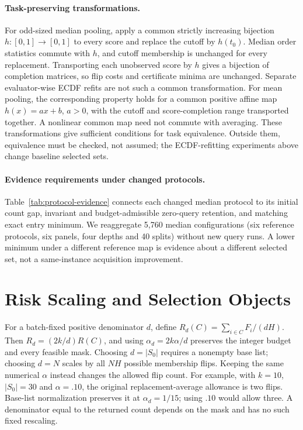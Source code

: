 \paragraph{Task-preserving transformations.}
For odd-sized median pooling, apply a common strictly increasing bijection $h:[0,1]\to[0,1]$ to every score and replace the cutoff by $h(t_0)$. Median order statistics commute with $h$, and cutoff membership is unchanged for every replacement. Transporting each unobserved score by $h$ gives a bijection of completion matrices, so flip costs and certificate minima are unchanged. Separate evaluator-wise ECDF refits are not such a common transformation. For mean pooling, the corresponding property holds for a common positive affine map $h(x)=ax+b$, $a>0$, with the cutoff and score-completion range transported together. A nonlinear common map need not commute with averaging. These transformations give sufficient conditions for task equivalence. Outside them, equivalence must be checked, not assumed; the ECDF-refitting experiments above change baseline selected sets.

\paragraph{Evidence requirements under changed protocols.}
Table~\ref{tab:protocol-evidence} connects each changed median protocol to its initial count gap, invariant and budget-admissible zero-query retention, and matching exact entry minimum. We reaggregate 5,760 median configurations (six reference protocols, six panels, four depths and 40 splits) without new query runs. A lower minimum under a different reference map is evidence about a different selected set, not a same-instance acquisition improvement.

\section{Risk Scaling and Selection Objects}
\label{app:risk-interpretation}
For a batch-fixed positive denominator $d$, define $R_d(C)=\sum_{i\in C}F_i/(dH)$. Then $R_d=(2k/d)R(C)$, and using $\alpha_d=2k\alpha/d$ preserves the integer budget and every feasible mask. Choosing $d=|S_0|$ requires a nonempty base list; choosing $d=N$ scales by all $NH$ possible membership flips. Keeping the same numerical $\alpha$ instead changes the allowed flip count. For example, with $k=10$, $|S_0|=30$ and $\alpha=.10$, the original replacement-average allowance is two flips. Base-list normalization preserves it at $\alpha_d=1/15$; using $.10$ would allow three. A denominator equal to the returned count depends on the mask and has no such fixed rescaling.

